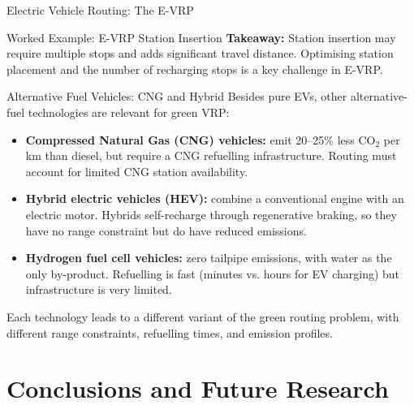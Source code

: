 \documentclass[aspectratio=169,10pt]{beamer}
\begin{document}
\begin{frame}[allowframebreaks]{Electric Vehicle Routing: The E-VRP}
\begin{exampleblock}{Worked Example: E-VRP Station Insertion}
    \medskip
    \textbf{Takeaway:} Station insertion may require multiple stops and
    adds significant travel distance.  Optimising station placement and
    the number of recharging stops is a key challenge in E-VRP.
  \end{exampleblock}

  \framebreak

  \begin{block}{Alternative Fuel Vehicles: CNG and Hybrid}
    Besides pure EVs, other alternative-fuel technologies are relevant for
    green VRP:
    \begin{itemize}
      \item \textbf{Compressed Natural Gas (CNG) vehicles:} emit 20--25\%
      less CO$_2$ per km than diesel, but require a CNG refuelling
      infrastructure.  Routing must account for limited CNG station availability.
      \item \textbf{Hybrid electric vehicles (HEV):} combine a conventional
      engine with an electric motor.  Hybrids self-recharge through regenerative
      braking, so they have no range constraint but do have reduced emissions.
      \item \textbf{Hydrogen fuel cell vehicles:} zero tailpipe emissions,
      with water as the only by-product.  Refuelling is fast (minutes vs.
      hours for EV charging) but infrastructure is very limited.
    \end{itemize}
    Each technology leads to a different variant of the green routing problem,
    with different range constraints, refuelling times, and emission profiles.
  \end{block}

\end{frame}

\section{Conclusions and Future Research}
\end{document}
